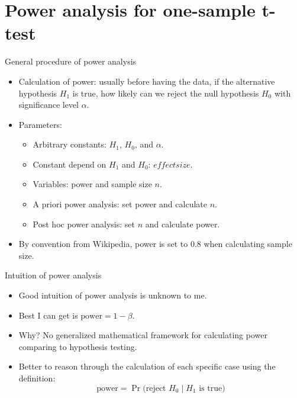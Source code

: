 \documentclass[12pt, t, xcolor=dvipsnames]{beamer}
\begin{document}

\section{Power analysis for one-sample t-test} %
\label{sec:power_analysis_for_one_sample_t_test}


\begin{frame}{General procedure of power analysis}
\begin{itemize}
  \item Calculation of power: usually before having the data, if the \alert{alternative hypothesis $H_1$} is true, how likely can we \alert{reject the null hypothesis $H_0$} with significance level \alert{$\alpha$}. 
  \item Parameters:
  \begin{itemize}
    \item Arbitrary constants: $H_1$, $H_0$, and $\alpha$.
    \item Constant depend on $H_1$ and $H_0$: $effect size$. 
    \item Variables: power and sample size $n$. 
    \item A priori power analysis: set power and calculate $n$. 
    \item Post hoc power analysis: set $n$ and calculate power. 
  \end{itemize}
  \item By convention from Wikipedia, power is set to $0.8$ when calculating sample size.
\end{itemize}
\end{frame}

\begin{frame}{Intuition of power analysis}
\begin{itemize}
  \item Good intuition of power analysis is unknown to me. 
  \item Best I can get is $\text{power} = 1 - \beta$.
  \item Why? No generalized mathematical framework for calculating power comparing to hypothesis testing. 
  \item Better to reason through the calculation of each specific case using the definition: $$\text{power} = \Pr {\big (}{\text{reject }}H_{0}\mid H_{1}{\text{ is true}}{\big )}$$
\end{itemize}
\end{frame}
\end{document}
